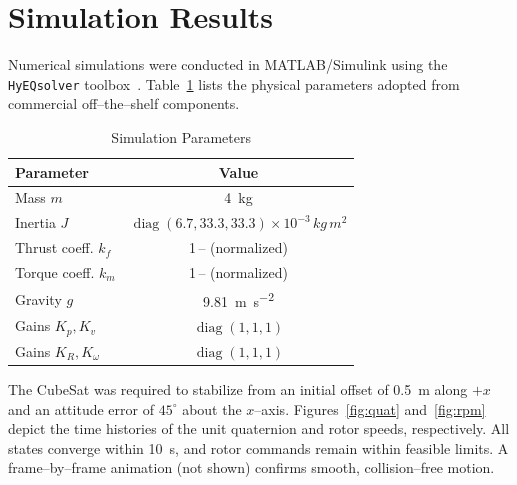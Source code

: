 \documentclass[journal]{IEEEtran}
\begin{document}
\section{Simulation Results}
Numerical simulations were conducted in MATLAB/Simulink using the \texttt{HyEQsolver} toolbox~\cite{HyEQ2012}. Table~\ref{tab:params} lists the physical parameters adopted from commercial off--the--shelf components.

\begin{table}[!t]
  \caption{Simulation Parameters}
  \label{tab:params}
  \centering
  \begin{tabular}{lc}
    \hline
    Parameter & Value \\
    \hline
    Mass $m$ & \qty{4}{kg} \\
    Inertia $J$ & $\operatorname{diag}(6.7,33.3,33.3)\times10^{-3}\,\si{kg\,m^{2}}$ \\
    Thrust coeff. $k_f$ & \num{1}\,-- (normalized) \\
    Torque coeff. $k_m$ & \num{1}\,-- (normalized) \\
    Gravity $g$ & \qty{9.81}{m\per s^{2}} \\
    Gains $K_p,K_v$ & $\operatorname{diag}(1,1,1)$ \\
    Gains $K_R,K_\omega$ & $\operatorname{diag}(1,1,1)$ \\
    \hline
  \end{tabular}
\end{table}

The CubeSat was required to stabilize from an initial offset of \qty{0.5}{m} along $+x$ and an attitude error of $45^{\circ}$ about the $x$--axis. Figures~\ref{fig:quat} and~\ref{fig:rpm} depict the time histories of the unit quaternion and rotor speeds, respectively. All states converge within \qty{10}{s}, and rotor commands remain within feasible limits. A frame--by--frame animation (not shown) confirms smooth, collision--free motion.


\end{document}
